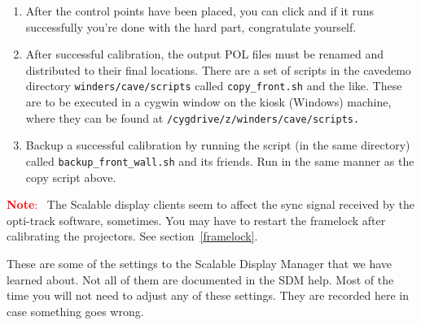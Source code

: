 \documentclass[11pt]{article}
\newenvironment{note}[1][Note]{\begin{lrbox}{\notebox}%
    \begin{minipage}{0.9\columnwidth}\textcolor{red}{\textbf{#1}:~}}%
    {\end{minipage}\end{lrbox}\begin{center}\setlength{\fboxsep}{8pt}%
    \fbox{\usebox{\notebox}}\end{center}}
\newcommand{\cmd}[1]{\texttt{#1}\xspace}
\newcommand{\button}[1]{\framebox{\textsf{#1}\xspace}}
\begin{document}
\begin{enumerate}
\item After the control points have been placed, you can click
  \button{Update Calibration} and if it runs successfully you're done with
  the hard part, congratulate yourself.

\item After successful calibration, the output POL files must be
  renamed and distributed to their final locations.  There are a set
  of scripts in the cavedemo directory \cmd{winders/cave/scripts}
  called \cmd{copy\_front.sh} and the like.  These are to be executed in
  a cygwin window on the kiosk (Windows) machine, where they can be
  found at \cmd{/cygdrive/z/winders/cave/scripts.}

\item Backup a successful calibration by running the script (in the
  same directory) called \cmd{backup\_front\_wall.sh} and its friends.
  Run in the same manner as the copy script above.


\end{enumerate}

\begin{note}
  The Scalable display clients seem to affect the sync signal received
  by the opti-track software, sometimes.  You may have to restart the
  framelock after calibrating the projectors.  See
  section~\ref{framelock}.
\end{note}


These are some of the settings to the Scalable Display Manager that we
have learned about.  Not all of them are documented in the SDM help.
Most of the time you will not need to adjust any of these settings.  They
are recorded here in case something goes wrong.
\end{document}
